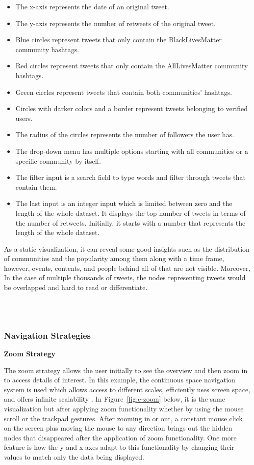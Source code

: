 \begin{itemize}
    \item The x-axis represents the date of an original tweet.  
    \item The y-axis represents the number of retweets of the original tweet.
    \item Blue circles represent tweets that only contain the BlackLivesMatter community hashtags.
    \item Red circles represent tweets that only contain the AllLivesMatter community hashtags.
    \item Green circles represent tweets that contain both communities' hashtags.
    \item Circles with darker colors and a border represent tweets belonging to verified users.
    \item The radius of the circles represents the number of followers the user has.
    \item The drop-down menu has multiple options starting with all communities or a specific community by itself.
    \item The filter input is a search field to type words and filter through tweets that contain them.
    \item The last input is an integer input which is limited between zero and the length of the whole dataset. It displays the top number of tweets in terms of the number of retweets. Initially, it starts with a number that represents the length of the whole dataset.  

\end{itemize}

As a static visualization, it can reveal some good insights such as the distribution of communities and the popularity among them along with a time frame, however, events, contents, and people behind all of that are not visible. Moreover, In the case of multiple thousands of tweets, the nodes representing tweets would be overlapped and hard to read or differentiate.  

\\\

\subsubsection{Navigation Strategies}

\textbf{Zoom Strategy}

The zoom strategy allows the user initially to see the overview and then zoom in to access details of interest. In this example, the continuous space navigation system is used which allows access to different scales, efficiently uses screen space, and offers infinite scalability \cite{bederson1994pad++, johnson1999tree}. In Figure~\ref{fig:e-zoom} below, it is the same visualization but after applying zoom functionality whether by using the mouse scroll or the trackpad gestures. After zooming in or out, a constant mouse click on the screen plus moving the mouse to any direction brings out the hidden nodes that disappeared after the application of zoom functionality. One more feature is how the y and x axes adapt to this functionality by changing their values to match only the data being displayed.  
\\\

